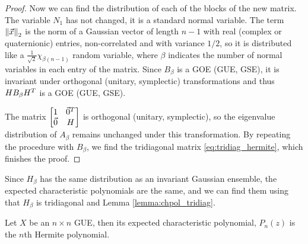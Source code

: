\begin{proof}
    Now we can find the distribution of each of the blocks of the new matrix. The variable $N_1$ has not changed, it is a standard normal variable. The term $\left\lVert\vec x\right\rVert_2$ is the norm of a Gaussian vector of length $n-1$ with real (complex or quaternionic) entries, non-correlated and with variance $1/2$, so it is distributed like a $\frac1{\sqrt{2}}\chi_{\beta(n-1)}$ random variable, where $\beta$ indicates the number of normal variables in each entry of the matrix. Since $B_\beta$ is a GOE (GUE, GSE), it is invariant under orthogonal (unitary, symplectic) transformations and thus $H B_{\beta} H^T$ is a GOE (GUE, GSE).

    The matrix $ \begin{bmatrix}
        1 & \vec0^T \\ 
        \vec0 & H
    \end{bmatrix}$ is orthogonal (unitary, symplectic), so the eigenvalue distribution of $A_\beta$ remains unchanged under this transformation. By repeating the procedure with $B_\beta$, we find the tridiagonal matrix \eqref{eq:tridiag_hermite}, which finishes the proof.
\end{proof}


Since $H_\beta$ has the same distribution as an invariant Gaussian ensemble, the expected characteristic polynomials are the same, and we can find them using that $H_\beta$ is tridiagonal and Lemma \ref{lemma:chpol_tridiag}.



\begin{theorem}
    Let $X$ be an $n\times n$ GUE, then its expected characteristic polynomial, $P_n(z)$ is the $n$th Hermite polynomial.
\end{theorem}

